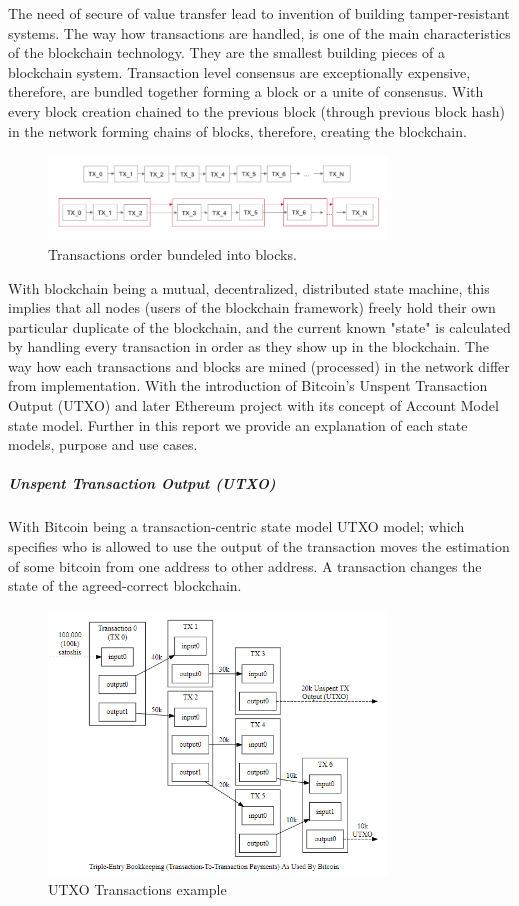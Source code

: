 The need of secure of value transfer lead to invention of building tamper-resistant systems. The way how transactions are handled, is one of the main characteristics of the blockchain technology. They are the smallest building pieces of a blockchain system. Transaction level consensus are exceptionally expensive, therefore, are bundled together forming a block or a unite of consensus. With every block creation chained to the previous block (through previous block hash) in the network forming chains of blocks, therefore, creating the blockchain.


\begin{figure}[h]
\centering
\includegraphics[width=0.8\textwidth]{images/transactions_blocks.png}
\caption{\label{fig:Transactions}Transactions order bundeled into blocks.}
\end{figure}


With blockchain being a mutual, decentralized, distributed state machine, this implies that all nodes (users of the blockchain framework) freely hold their own particular duplicate of the blockchain, and the current known "state" is calculated by handling every transaction in order as they show up in the blockchain. The way how each transactions and blocks are mined (processed) in the network differ from implementation. With the introduction of Bitcoin’s Unspent Transaction Output (UTXO) and later Ethereum project with its concept of Account Model state model. Further in this report we provide an explanation of each state models, purpose and use cases.

\subparagraph{Unspent Transaction Output (UTXO)}

With Bitcoin being a transaction-centric state model UTXO model; which specifies who is allowed to use the output of the transaction moves the estimation of some bitcoin from one address to other address. A transaction changes the state of the agreed-correct blockchain. 

\begin{figure}[h]
\centering
\includegraphics[width=0.8\textwidth]{images/UTXO.png}
\caption{\label{fig:UTXO}UTXO Transactions example}
\end{figure}

